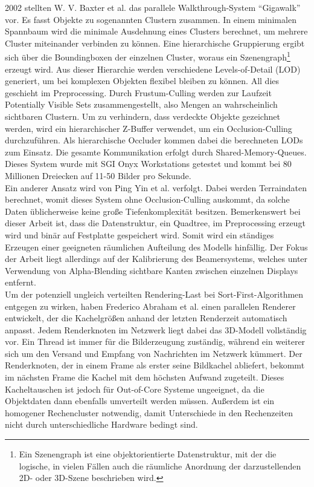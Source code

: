 2002 stellten W. V. Baxter et al. \cite{baxter} das parallele Walkthrough-System "`Gigawalk"' vor. Es fasst Objekte zu sogenannten Clustern zusammen. In einem minimalen Spannbaum wird die minimale Ausdehnung eines Clusters berechnet, um mehrere Cluster miteinander verbinden zu können. Eine hierarchische Gruppierung ergibt sich über die Boundingboxen der einzelnen Cluster, woraus ein Szenengraph\footnote{Ein Szenengraph ist eine objektorientierte Datenstruktur, mit der die logische, in vielen Fällen auch die räumliche Anordnung der darzustellenden 2D- oder 3D-Szene beschrieben wird.} erzeugt wird. Aus dieser Hierarchie werden verschiedene Levels-of-Detail (LOD)\cite{hlod} generiert, um bei komplexen Objekten flexibel bleiben zu können. All dies geschieht im Preprocessing. Durch Frustum-Culling werden zur Laufzeit Potentially Visible Sets \cite{RTR3} zusammengestellt, also Mengen an wahrscheinlich sichtbaren Clustern. Um zu verhindern, dass verdeckte Objekte gezeichnet werden, wird ein hierarchischer Z-Buffer verwendet, um ein Occlusion-Culling durchzuführen. Als hierarchische Occluder kommen dabei die berechneten LODs zum Einsatz. Die gesamte Kommunikation erfolgt durch Shared-Memory-Queues. Dieses System wurde mit SGI Onyx Workstations getestet und kommt bei 80 Millionen Dreiecken auf 11-50 Bilder pro Sekunde.\\
Ein anderer Ansatz wird von Ping Yin et al. \cite{DBLP:journals/ijvr/YinJSZ06} verfolgt. Dabei werden Terraindaten berechnet, womit dieses System ohne Occlusion-Culling auskommt, da solche Daten üblicherweise keine große Tiefenkomplexität besitzen. Bemerkenswert bei dieser Arbeit ist, dass die Datenstruktur, ein Quadtree, im Preprocessing erzeugt wird und binär auf Festplatte gespeichert wird. Somit wird ein ständiges Erzeugen einer geeigneten räumlichen Aufteilung des Modells hinfällig. Der Fokus der Arbeit liegt allerdings auf der Kalibrierung des Beamersystems, welches unter Verwendung von Alpha-Blending sichtbare Kanten zwischen einzelnen Displays entfernt.\\
Um der potenziell ungleich verteilten Rendering-Last bei Sort-First-Algorithmen entgegen zu wirken, haben Frederico Abraham et al. \cite{abraham} einen parallelen Renderer entwickelt, der die Kachelgrößen anhand der letzten Renderzeit automatisch anpasst. Jedem Renderknoten im Netzwerk liegt dabei das 3D-Modell vollständig vor. Ein Thread ist immer für die Bilderzeugung zuständig, während ein weiterer sich um den Versand und Empfang von Nachrichten im Netzwerk kümmert. Der Renderknoten, der in einem Frame als erster seine Bildkachel abliefert, bekommt im nächsten Frame die Kachel mit dem höchsten Aufwand zugeteilt. Dieses Kacheltauschen ist jedoch für Out-of-Core Systeme ungeeignet, da die Objektdaten dann ebenfalls umverteilt werden müssen. Außerdem ist ein homogener Rechencluster notwendig, damit Unterschiede in den Rechenzeiten nicht durch unterschiedliche Hardware bedingt sind.

